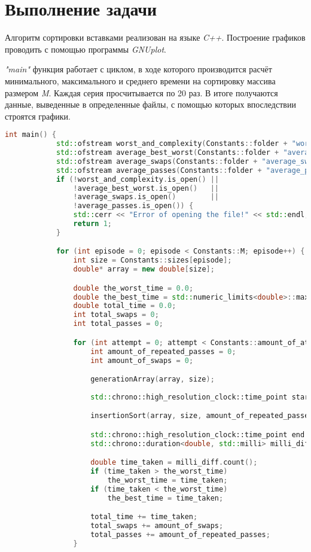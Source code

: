 \documentclass[12pt, a4paper]{report}
\begin{document}
	\section*{Выполнение задачи}
	Алгоритм сортировки вставками реализован на языке \textit{C++}. Построение графиков проводить с помощью программы \textit{GNUplot}.

	\textit{"main"} функция работает с циклом, в ходе которого производится расчёт минимального, максимального и среднего времени на сортировку массива размером \textit{M}. Каждая серия просчитывается по 20 раз. В итоге получаются данные, выведенные в определенные файлы, с помощью которых впоследствии строятся графики.
	\lstset{style=mystyle}
	\begin{lstlisting}[language=C++]
		int main() {
			std::ofstream worst_and_complexity(Constants::folder + "worst_and_complexity.dat");
			std::ofstream average_best_worst(Constants::folder + "average_best_worst.dat");
			std::ofstream average_swaps(Constants::folder + "average_swaps.dat");
			std::ofstream average_passes(Constants::folder + "average_passes.dat");
			if (!worst_and_complexity.is_open() ||
				!average_best_worst.is_open()   ||
				!average_swaps.is_open()        ||
				!average_passes.is_open()) {
				std::cerr << "Error of opening the file!" << std::endl;
				return 1;
			}

			for (int episode = 0; episode < Constants::M; episode++) {
				int size = Constants::sizes[episode];
				double* array = new double[size];

				double the_worst_time = 0.0;
				double the_best_time = std::numeric_limits<double>::max();
				double total_time = 0.0;
				int total_swaps = 0;
				int total_passes = 0;

				for (int attempt = 0; attempt < Constants::amount_of_attempts; attempt++) {
					int amount_of_repeated_passes = 0;
					int amount_of_swaps = 0;

					generationArray(array, size);
					
					std::chrono::high_resolution_clock::time_point start = std::chrono::high_resolution_clock::now();

					insertionSort(array, size, amount_of_repeated_passes, amount_of_swaps);	

					std::chrono::high_resolution_clock::time_point end = std::chrono::high_resolution_clock::now();
					std::chrono::duration<double, std::milli> milli_diff = end - start;

					double time_taken = milli_diff.count();
					if (time_taken > the_worst_time)
						the_worst_time = time_taken;
					if (time_taken < the_worst_time)
						the_best_time = time_taken;

					total_time += time_taken;
					total_swaps += amount_of_swaps;
					total_passes += amount_of_repeated_passes;
				}
	\end{lstlisting}
\end{document}

